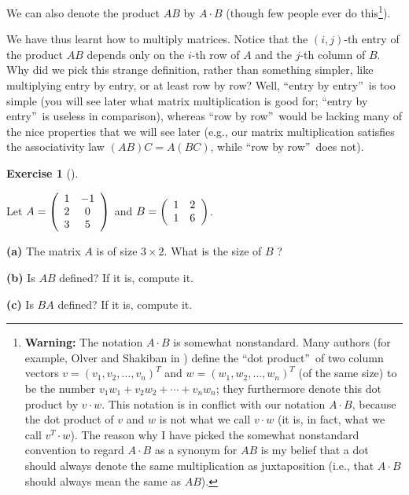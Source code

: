 \documentclass[numbers=enddot,12pt,final,onecolumn,notitlepage]{scrartcl}%
\theoremstyle{definition}
\newtheorem{exmp}[theo]{Exercise}
\newenvironment{exercise}[1][]
{\begin{exmp}[#1]\begin{leftbar}}
{\end{leftbar}\end{exmp}}
\begin{document}
We can also denote the product $AB$ by $A\cdot B$ (though few people ever do
this\footnote{\textbf{Warning:} The notation $A\cdot B$ is somewhat
nonstandard. Many authors (for example, Olver and Shakiban in \cite[\S 3.1]%
{OlvSha06}) define the \textquotedblleft dot product\textquotedblright\ of two
column vectors $v=\left(  v_{1},v_{2},\ldots,v_{n}\right)  ^{T}$ and
$w=\left(  w_{1},w_{2},\ldots,w_{n}\right)  ^{T}$ (of the same size) to be the
number $v_{1}w_{1}+v_{2}w_{2}+\cdots+v_{n}w_{n}$; they furthermore denote this
dot product by $v\cdot w$. This notation is in conflict with our notation
$A\cdot B$, because the dot product of $v$ and $w$ is not what we call $v\cdot
w$ (it is, in fact, what we call $v^{T}\cdot w$). The reason why I have picked
the somewhat nonstandard convention to regard $A\cdot B$ as a synonym for $AB$
is my belief that a dot should always denote the same multiplication as
juxtaposition (i.e., that $A\cdot B$ should always mean the same as $AB$).}).

We have thus learnt how to multiply matrices. Notice that the $\left(
i,j\right)  $-th entry of the product $AB$ depends only on the $i$-th row of
$A$ and the $j$-th column of $B$. Why did we pick this strange definition,
rather than something simpler, like multiplying entry by entry, or at least
row by row? Well, \textquotedblleft entry by entry\textquotedblright\ is too
simple (you will see later what matrix multiplication is good for;
\textquotedblleft entry by entry\textquotedblright\ is useless in comparison),
whereas \textquotedblleft row by row\textquotedblright\ would be lacking many
of the nice properties that we will see later (e.g., our matrix multiplication
satisfies the associativity law $\left(  AB\right)  C=A\left(  BC\right)  $,
while \textquotedblleft row by row\textquotedblright\ does not).

\begin{exercise}
\label{exe.AB-defined}Let $A=\left(
\begin{array}
[c]{cc}%
1 & -1\\
2 & 0\\
3 & 5
\end{array}
\right)  $ and $B=\left(
\begin{array}
[c]{cc}%
1 & 2\\
1 & 6
\end{array}
\right)  $.

\textbf{(a)} The matrix $A$ is of size $3\times2$. What is the size of $B$ ?

\textbf{(b)} Is $AB$ defined? If it is, compute it.

\textbf{(c)} Is $BA$ defined? If it is, compute it.
\end{exercise}
\end{document}
